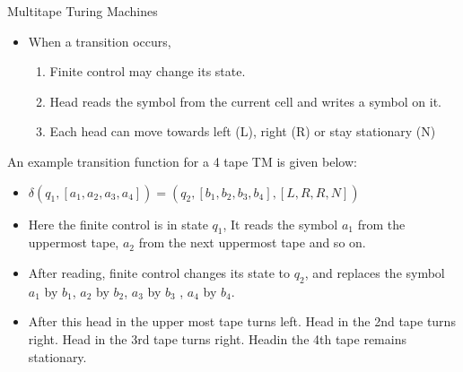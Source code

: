 \documentclass{beamer}
\begin{document}
\begin{frame}{ Multitape Turing Machines}
	\begin{itemize}
		\item When a transition occurs,
		\begin{enumerate}
			\item Finite control may change its state.
			\item Head reads the symbol from the current cell and writes a symbol on it.
			\item Each head can move towards left (L), right (R) or stay stationary (N)
		\end{enumerate}
	\end{itemize}
An example transition function for a 4 tape TM is given below:
\begin{itemize}
	\item $\delta(q_1, [a_1, a_2, a_3, a_4]) = (q_2, [b_1, b_2, b_3, b_4], [L, R, R, N])$
	\item Here the finite control is in state $q_1$, It reads the symbol $a_1$ from the uppermost tape, $a_2$ from the next uppermost tape and so on.
  \item After reading, finite control changes its state to $q_2$, and replaces the symbol $a_1$ by $b_1$, $a_2$ by $b_2$, $a_3$ by $b_3$ , $a_4$ by $b_4$.
\item After this head in the upper most tape turns left.
 Head in the 2nd tape turns right. Head in the 3rd tape turns right. Headin the 4th tape remains stationary.

\end{itemize}
\end{frame}
\end{document}
